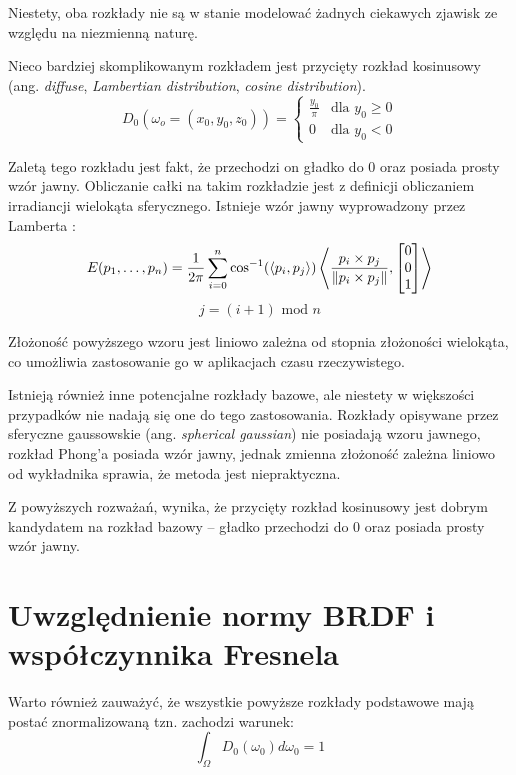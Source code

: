 \documentclass[../main.tex]{subfiles}
\begin{document}
Niestety, oba rozkłady nie są w stanie modelować żadnych ciekawych zjawisk ze względu na niezmienną naturę.

Nieco bardziej skomplikowanym rozkładem jest przycięty rozkład kosinusowy (ang. \textit{diffuse}, \textit{Lambertian distribution}, \textit{cosine distribution}).
\[
D_0(\omega_o=(x_0, y_0, z_0)) = \begin{cases}
  \frac{y_0}{\pi} & \text{dla } y_0 \geq 0 \\
  0 & \text{dla } y_0 < 0
\end{cases}
\]

Zaletą tego rozkładu jest fakt, że przechodzi on gładko do $0$ oraz posiada prosty wzór jawny. Obliczanie całki na takim rozkładzie jest z definicji obliczaniem irradiancji wielokąta sferycznego. Istnieje wzór jawny wyprowadzony przez Lamberta \cite{Baum}:
\[
E(p_1, \ldots, p_n) =
\frac{1}{2\pi}
\sum_{i=0}^{n} {
  \cos^{-1}(\langle p_i, p_j \rangle)
  \left\langle {
    \frac{p_i \times p_j}{\norm{p_i \times p_j}},
    \left[ \begin{matrix} 0 \\ 0 \\ 1 \end{matrix} \right]
  } \right\rangle
}
\]
\[
j = (i+1) \text{ mod } n
\]

Złożoność powyższego wzoru jest liniowo zależna od stopnia złożoności wielokąta, co umożliwia zastosowanie go w aplikacjach czasu rzeczywistego.

Istnieją również inne potencjalne rozkłady bazowe, ale niestety w większości przypadków nie nadają się one do tego zastosowania. Rozkłady opisywane przez sferyczne gaussowskie (ang. \textit{spherical gaussian}) nie posiadają wzoru jawnego, rozkład Phong’a posiada wzór jawny, jednak zmienna złożoność zależna liniowo od wykładnika sprawia, że metoda jest niepraktyczna.

Z powyższych rozważań, wynika, że przycięty rozkład kosinusowy jest dobrym kandydatem na rozkład bazowy – gładko przechodzi do 0 oraz posiada prosty wzór jawny.

\section{Uwzględnienie  normy BRDF i współczynnika Fresnela}

Warto również zauważyć, że wszystkie powyższe rozkłady podstawowe mają postać znormalizowaną tzn. zachodzi warunek:
\[
\int_\Omega {
    D_0(\omega_0)
    d \omega_0
} = 1
\]
\end{document}
